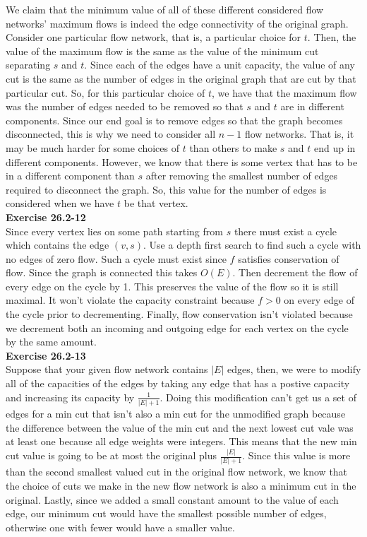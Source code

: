 \documentclass{article}
\begin{document}
We claim that the minimum value of all of these different considered flow networks' maximum flows is indeed the edge connectivity of the original graph. Consider one particular flow network, that is, a particular choice for $t$. Then, the value of the maximum flow is the same as the value of the minimum cut separating $s$ and $t$. Since each of the edges have a unit capacity, the value of any cut is the same as the number of edges in the original graph that are cut by that particular cut. So, for this particular choice of $t$, we have that the maximum flow was the number of edges needed to be removed so that $s$ and $t$ are in different components. Since our end goal is to remove edges so that the graph becomes disconnected, this is why we need to consider all $n-1$ flow networks. That is, it may be much harder for some choices of $t$ than others to make $s$ and $t$ end up in different components. However, we know that there is some vertex that has to be in a different component than $s$ after removing the smallest number of edges required to disconnect the graph. So, this value for the number of edges is considered when we have $t$ be that vertex.\\

\noindent\textbf{Exercise 26.2-12}\\ 

Since every vertex lies on some path starting from $s$ there must exist a cycle which contains the edge $(v,s)$.  Use a depth first search to find such a cycle with no edges of zero flow.  Such a cycle must exist since $f$ satisfies conservation of flow.  Since the graph is connected this takes $O(E)$.  Then decrement the flow of every edge on the cycle by 1.  This preserves the value of the flow so it is still maximal.  It won't violate the capacity constraint because $f > 0$ on every edge of the cycle prior to decrementing.  Finally, flow conservation isn't violated because we decrement both an incoming and outgoing edge for each vertex on the cycle by the same amount. \\

\noindent\textbf{Exercise 26.2-13}\\

Suppose that your given flow network contains $|E|$ edges, then, we were to modify all of the capacities of the edges by taking any edge that has a postive capacity and increasing its capacity by $\frac{1}{|E|+1}$. Doing this modification can't get us a set of edges for a min cut that isn't also a min cut for the unmodified graph because the difference between the value of the min cut and the next lowest cut vale was at least one because all edge weights were integers. This means that the new min cut value is going to be at most the original plus $\frac{|E|}{|E|+1}$. Since this value is more than the second smallest valued cut in the original flow network, we know that the choice  of cuts we make in the new flow network is also a minimum cut in the original. Lastly, since we added a small constant amount to the value of each edge, our minimum cut would have the smallest possible number of edges, otherwise one with fewer would have a smaller value.\\
\end{document}
